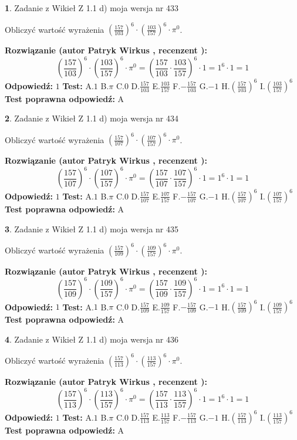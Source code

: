 \documentclass[12pt, a4paper]{article}
\theoremstyle{definition} %
\newtheorem{zad}{}
\newcommand{\zadStart}[1]{\begin{zad}#1\newline}
\newcommand{\zadStop}{\end{zad}}
\newcommand{\rozwStart}[2]{\noindent \textbf{Rozwiązanie (autor #1 , recenzent #2): }\newline}
\newcommand{\rozwStop}{\newline}
\newcommand{\odpStart}{\noindent \textbf{Odpowiedź:}\newline}
\newcommand{\odpStop}{\newline}
\newcommand{\testStart}{\noindent \textbf{Test:}\newline}
\newcommand{\testStop}{\newline}
\newcommand{\kluczStart}{\noindent \textbf{Test poprawna odpowiedź:}\newline}
\newcommand{\kluczStop}{\newline}
\begin{document}
\zadStart{Zadanie z Wikieł Z 1.1 d) moja wersja nr 433}

Obliczyć wartość wyrażenia $(\frac{157}{103})^{6} \cdot (\frac{103}{157})^{6} \cdot \pi^{0}$.
\zadStop
\rozwStart{Patryk Wirkus}{}
$$(\frac{157}{103})^{6} \cdot (\frac{103}{157})^{6} \cdot \pi^{0} = (\frac{157}{103} \cdot \frac{103}{157})^{6} \cdot 1 = 1^{6} \cdot 1 = 1$$
\rozwStop
\odpStart
$1$
\odpStop
\testStart
A.$1$ B.$\pi$ C.$0$ D.$\frac{157}{103}$ E.$\frac{103}{157}$
F.$-\frac{157}{103}$ G.$-1$
H.$(\frac{157}{103})^{6}$
I.$(\frac{103}{157})^{6}$
\testStop
\kluczStart
A
\kluczStop



\zadStart{Zadanie z Wikieł Z 1.1 d) moja wersja nr 434}

Obliczyć wartość wyrażenia $(\frac{157}{107})^{6} \cdot (\frac{107}{157})^{6} \cdot \pi^{0}$.
\zadStop
\rozwStart{Patryk Wirkus}{}
$$(\frac{157}{107})^{6} \cdot (\frac{107}{157})^{6} \cdot \pi^{0} = (\frac{157}{107} \cdot \frac{107}{157})^{6} \cdot 1 = 1^{6} \cdot 1 = 1$$
\rozwStop
\odpStart
$1$
\odpStop
\testStart
A.$1$ B.$\pi$ C.$0$ D.$\frac{157}{107}$ E.$\frac{107}{157}$
F.$-\frac{157}{107}$ G.$-1$
H.$(\frac{157}{107})^{6}$
I.$(\frac{107}{157})^{6}$
\testStop
\kluczStart
A
\kluczStop



\zadStart{Zadanie z Wikieł Z 1.1 d) moja wersja nr 435}

Obliczyć wartość wyrażenia $(\frac{157}{109})^{6} \cdot (\frac{109}{157})^{6} \cdot \pi^{0}$.
\zadStop
\rozwStart{Patryk Wirkus}{}
$$(\frac{157}{109})^{6} \cdot (\frac{109}{157})^{6} \cdot \pi^{0} = (\frac{157}{109} \cdot \frac{109}{157})^{6} \cdot 1 = 1^{6} \cdot 1 = 1$$
\rozwStop
\odpStart
$1$
\odpStop
\testStart
A.$1$ B.$\pi$ C.$0$ D.$\frac{157}{109}$ E.$\frac{109}{157}$
F.$-\frac{157}{109}$ G.$-1$
H.$(\frac{157}{109})^{6}$
I.$(\frac{109}{157})^{6}$
\testStop
\kluczStart
A
\kluczStop



\zadStart{Zadanie z Wikieł Z 1.1 d) moja wersja nr 436}

Obliczyć wartość wyrażenia $(\frac{157}{113})^{6} \cdot (\frac{113}{157})^{6} \cdot \pi^{0}$.
\zadStop
\rozwStart{Patryk Wirkus}{}
$$(\frac{157}{113})^{6} \cdot (\frac{113}{157})^{6} \cdot \pi^{0} = (\frac{157}{113} \cdot \frac{113}{157})^{6} \cdot 1 = 1^{6} \cdot 1 = 1$$
\rozwStop
\odpStart
$1$
\odpStop
\testStart
A.$1$ B.$\pi$ C.$0$ D.$\frac{157}{113}$ E.$\frac{113}{157}$
F.$-\frac{157}{113}$ G.$-1$
H.$(\frac{157}{113})^{6}$
I.$(\frac{113}{157})^{6}$
\testStop
\kluczStart
A
\kluczStop
\end{document}
